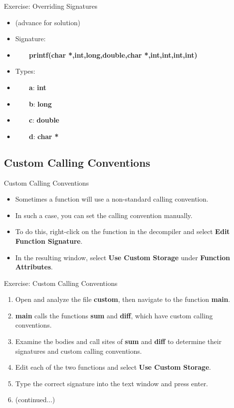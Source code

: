 \documentclass{beamer}
\begin{document}
\begin{frame}
\begin{block}{Exercise: Overriding Signatures}
\begin{itemize}
\item[] (advance for solution)
\pause
\item Signature:
\item[] ~~~~\textbf{printf(char *,int,long,double,char *,int,int,int,int)}
\item Types:
\item[] ~~~~\textbf{a}: \textbf{int}
\item[] ~~~~\textbf{b}: \textbf{long}
\item[] ~~~~\textbf{c}: \textbf{double}
\item[] ~~~~\textbf{d}: \textbf{char *}
\end{itemize}
\end{block}
\end{frame}

\subsection{Custom Calling Conventions}
\begin{frame}
\begin{block}{Custom Calling Conventions}
\begin{itemize}
\item Sometimes a function will use a non-standard calling convention.
\item In such a case, you can set the calling convention manually.
\item To do this, right-click on the function in the decompiler and select \textbf{Edit Function Signature}.
\item In the resulting window, select \textbf{Use Custom Storage} under \textbf{Function Attributes}.
\end{itemize}
\end{block}
\end{frame}

\begin{frame}
\begin{block}{Exercise: Custom Calling Conventions}
\begin{enumerate}
\item Open and analyze the file \textbf{custom}, then navigate to the function \textbf{main}.
\item \textbf{main} calls the functions \textbf{sum} and \textbf{diff}, which have custom calling conventions.
\item Examine the bodies and call sites of \textbf{sum} and \textbf{diff} to determine their signatures and custom calling conventions.
\item Edit each of the two functions and select \textbf{Use Custom Storage}.
\item Type the correct signature into the text window and press enter.
\item[] (continued...)
\end{enumerate}
\end{block}
\end{frame}
\end{document}
